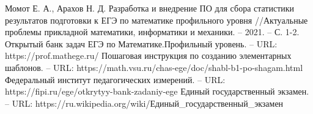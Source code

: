 \begin{thebibliography}{10}
     Момот Е. А., Арахов Н. Д. Разработка и внедрение ПО для сбора статистики результатов подготовки к ЕГЭ по математике профильного уровня //Актуальные проблемы прикладной математики, информатики и механики. – 2021. – С. 1-2.
    Открытый банк задач ЕГЭ по Математике.Профильный уровень. – URL:  https://prof.mathege.ru/
    Пошаговая инструкция по созданию элементарных шаблонов. – URL:  https://math.vsu.ru/chas-ege/doc/shabl-b1-po-shagam.html
    Федеральный институт педагогических измерений. – URL:  https://fipi.ru/ege/otkrytyy-bank-zadaniy-ege
     Единый государственный экзамен. – URL:  https://ru.wikipedia.org/wiki/Единый\_государственный\_экзамен
\end{thebibliography}